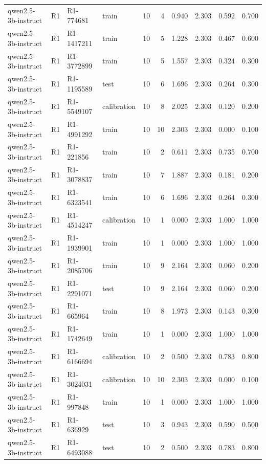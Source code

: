 \begin{table}
\begin{tabular}{llllrrrrrr}
qwen2.5-3b-instruct & R1 & R1-774681 & train & 10 & 4 & 0.940 & 2.303 & 0.592 & 0.700 \\
qwen2.5-3b-instruct & R1 & R1-1417211 & train & 10 & 5 & 1.228 & 2.303 & 0.467 & 0.600 \\
qwen2.5-3b-instruct & R1 & R1-3772899 & train & 10 & 5 & 1.557 & 2.303 & 0.324 & 0.300 \\
qwen2.5-3b-instruct & R1 & R1-1195589 & test & 10 & 6 & 1.696 & 2.303 & 0.264 & 0.300 \\
qwen2.5-3b-instruct & R1 & R1-5549107 & calibration & 10 & 8 & 2.025 & 2.303 & 0.120 & 0.200 \\
qwen2.5-3b-instruct & R1 & R1-4991292 & train & 10 & 10 & 2.303 & 2.303 & 0.000 & 0.100 \\
qwen2.5-3b-instruct & R1 & R1-221856 & train & 10 & 2 & 0.611 & 2.303 & 0.735 & 0.700 \\
qwen2.5-3b-instruct & R1 & R1-3078837 & train & 10 & 7 & 1.887 & 2.303 & 0.181 & 0.200 \\
qwen2.5-3b-instruct & R1 & R1-6323541 & train & 10 & 6 & 1.696 & 2.303 & 0.264 & 0.300 \\
qwen2.5-3b-instruct & R1 & R1-4514247 & calibration & 10 & 1 & 0.000 & 2.303 & 1.000 & 1.000 \\
qwen2.5-3b-instruct & R1 & R1-1939901 & train & 10 & 1 & 0.000 & 2.303 & 1.000 & 1.000 \\
qwen2.5-3b-instruct & R1 & R1-2085706 & train & 10 & 9 & 2.164 & 2.303 & 0.060 & 0.200 \\
qwen2.5-3b-instruct & R1 & R1-2291071 & test & 10 & 9 & 2.164 & 2.303 & 0.060 & 0.200 \\
qwen2.5-3b-instruct & R1 & R1-665964 & train & 10 & 8 & 1.973 & 2.303 & 0.143 & 0.300 \\
qwen2.5-3b-instruct & R1 & R1-1742649 & train & 10 & 1 & 0.000 & 2.303 & 1.000 & 1.000 \\
qwen2.5-3b-instruct & R1 & R1-6166694 & calibration & 10 & 2 & 0.500 & 2.303 & 0.783 & 0.800 \\
qwen2.5-3b-instruct & R1 & R1-3024031 & calibration & 10 & 10 & 2.303 & 2.303 & 0.000 & 0.100 \\
qwen2.5-3b-instruct & R1 & R1-997848 & train & 10 & 1 & 0.000 & 2.303 & 1.000 & 1.000 \\
qwen2.5-3b-instruct & R1 & R1-636929 & test & 10 & 3 & 0.943 & 2.303 & 0.590 & 0.500 \\
qwen2.5-3b-instruct & R1 & R1-6493088 & test & 10 & 2 & 0.500 & 2.303 & 0.783 & 0.800 \\

\end{tabular}
\end{table}
